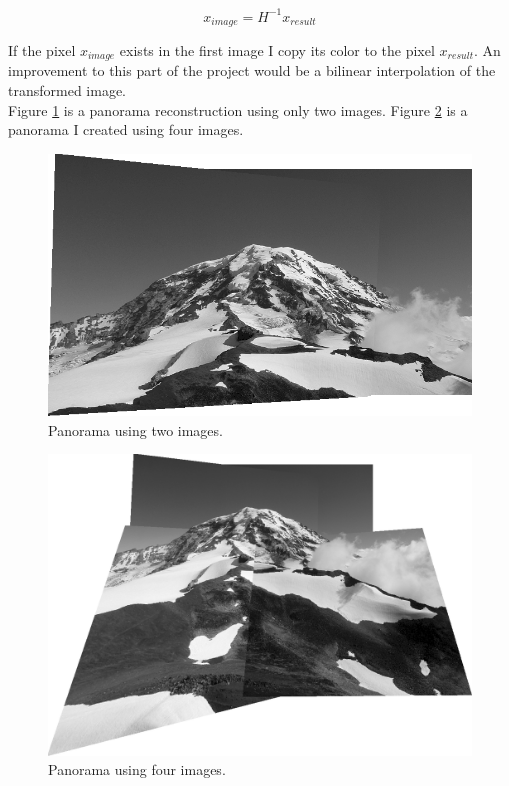 \documentclass[a4paper,twocolumn]{article}
\begin{document}
$$
x_{image} = H^{-1}x_{result}
$$

If the pixel $x_{image}$ exists in the first image I copy its color to the pixel $x_{result}$. An improvement to this part of the project would be a bilinear interpolation of the transformed image.
\\

Figure \ref{panorama_1-2} is a panorama reconstruction using only two images. Figure \ref{panorama} is a panorama I created using four images.

\begin{figure}
	\centering\includegraphics[width=\textwidth]{images/panorama_1-2.png}
	\caption{Panorama using two images.}
	\label{panorama_1-2}
\end{figure}

\begin{figure}
	\centering\includegraphics[width=\textwidth]{images/panorama.png}
	\caption{Panorama using four images.}
	\label{panorama}
\end{figure}
\end{document}
